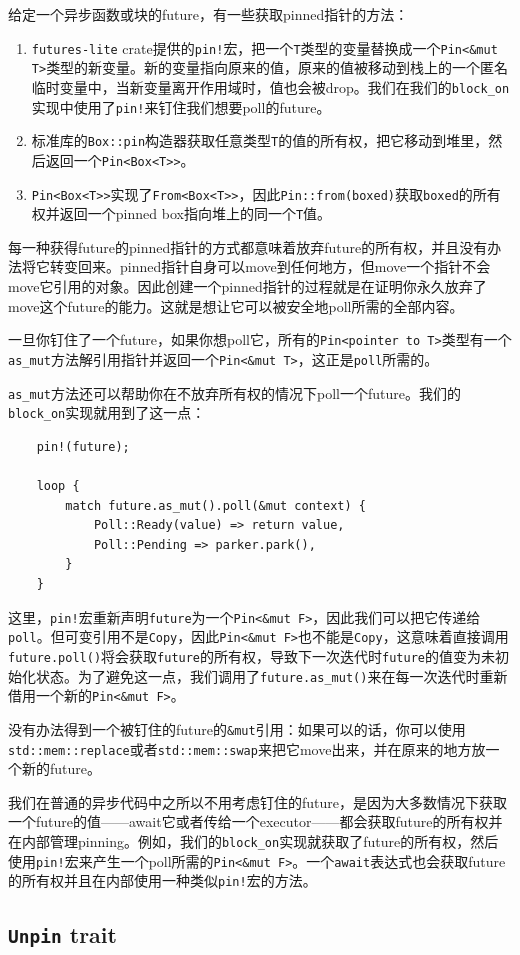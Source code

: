 给定一个异步函数或块的future，有一些获取pinned指针的方法：
\begin{enumerate}
    \item \texttt{futures-lite} crate提供的\texttt{pin!}宏，把一个\texttt{T}类型的变量替换成一个\texttt{Pin<\&mut T>}类型的新变量。新的变量指向原来的值，原来的值被移动到栈上的一个匿名临时变量中，当新变量离开作用域时，值也会被drop。我们在我们的\texttt{block\_on}实现中使用了\texttt{pin!}来钉住我们想要poll的future。
    \item 标准库的\texttt{Box::pin}构造器获取任意类型\texttt{T}的值的所有权，把它移动到堆里，然后返回一个\texttt{Pin<Box<T>>}。
    \item \texttt{Pin<Box<T>>}实现了\texttt{From<Box<T>>}，因此\texttt{Pin::from(boxed)}获取\texttt{boxed}的所有权并返回一个pinned box指向堆上的同一个\texttt{T}值。
\end{enumerate}

每一种获得future的pinned指针的方式都意味着放弃future的所有权，并且没有办法将它转变回来。pinned指针自身可以move到任何地方，但move一个指针不会move它引用的对象。因此创建一个pinned指针的过程就是在证明你永久放弃了move这个future的能力。这就是想让它可以被安全地poll所需的全部内容。

一旦你钉住了一个future，如果你想poll它，所有的\texttt{Pin<pointer to T>}类型有一个\texttt{as\_mut}方法解引用指针并返回一个\texttt{Pin<&mut T>}，这正是\texttt{poll}所需的。

\texttt{as\_mut}方法还可以帮助你在不放弃所有权的情况下poll一个future。我们的\texttt{block\_on}实现就用到了这一点：
\begin{verbatim}
    pin!(future);

    loop {
        match future.as_mut().poll(&mut context) {
            Poll::Ready(value) => return value,
            Poll::Pending => parker.park(),
        }
    }
\end{verbatim}

这里，\texttt{pin!}宏重新声明\texttt{future}为一个\texttt{Pin<\&mut F>}，因此我们可以把它传递给\texttt{poll}。但可变引用不是\texttt{Copy}，因此\texttt{Pin<\&mut F>}也不能是\texttt{Copy}，这意味着直接调用\texttt{future.poll()}将会获取\texttt{future}的所有权，导致下一次迭代时\texttt{future}的值变为未初始化状态。为了避免这一点，我们调用了\texttt{future.as\_mut()}来在每一次迭代时重新借用一个新的\texttt{Pin<\&mut F>}。

没有办法得到一个被钉住的future的\texttt{\&mut}引用：如果可以的话，你可以使用\texttt{std::mem::replace}或者\texttt{std::mem::swap}来把它move出来，并在原来的地方放一个新的future。

我们在普通的异步代码中之所以不用考虑钉住的future，是因为大多数情况下获取一个future的值——await它或者传给一个executor——都会获取future的所有权并在内部管理pinning。例如，我们的\texttt{block\_on}实现就获取了future的所有权，然后使用\texttt{pin!}宏来产生一个poll所需的\texttt{Pin<\&mut F>}。一个\texttt{await}表达式也会获取future的所有权并且在内部使用一种类似\texttt{pin!}宏的方法。

\subsection{\texttt{Unpin} trait}



